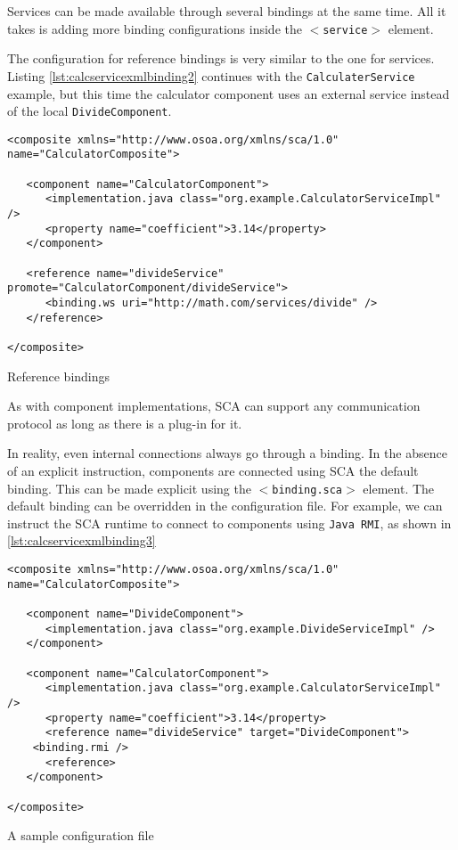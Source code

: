 Services can be made available through several bindings at the same time. All it takes is adding more binding configurations
inside the \texttt{$<$service$>$} element.

The configuration for reference bindings is very similar to the one for services. Listing \ref{lst:calcservicexmlbinding2}
continues with the \texttt{CalculaterService} example, but this time the calculator component uses an external service
instead of the local \texttt{DivideComponent}.

\begin{listing}
\begin{verbatim}
<composite xmlns="http://www.osoa.org/xmlns/sca/1.0" name="CalculatorComposite">

   <component name="CalculatorComponent">
      <implementation.java class="org.example.CalculatorServiceImpl" />
      <property name="coefficient">3.14</property>
   </component>
   
   <reference name="divideService" promote="CalculatorComponent/divideService">
      <binding.ws uri="http://math.com/services/divide" />
   </reference>
   
</composite>
\end{verbatim}
\caption{Reference bindings}
\label{lst:calcservicexmlbinding2}
\end{listing}

As with component implementations, SCA can support any communication protocol as long as there is a plug-in for it.

In reality, even internal connections always go through a binding. In the absence of an explicit instruction, components
are connected using SCA the default binding. This can be made explicit using the \texttt{$<$binding.sca$>$} element.
The default binding can be overridden in the configuration file. For example, we can instruct the SCA runtime to
connect to components using \texttt{Java RMI}, as shown in \ref{lst:calcservicexmlbinding3}

\begin{listing}
\begin{verbatim}
<composite xmlns="http://www.osoa.org/xmlns/sca/1.0" name="CalculatorComposite">

   <component name="DivideComponent">
      <implementation.java class="org.example.DivideServiceImpl" />
   </component>

   <component name="CalculatorComponent">
      <implementation.java class="org.example.CalculatorServiceImpl" />
      <property name="coefficient">3.14</property>
      <reference name="divideService" target="DivideComponent">
	<binding.rmi />
      <reference>
   </component>

</composite>
\end{verbatim}
\caption{A sample configuration file}
\label{lst:calcservicexmlbinding3}
\end{listing}

